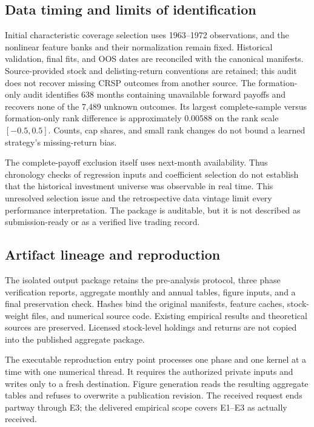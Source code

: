 \subsection{Data timing and limits of identification}
Initial characteristic coverage selection uses 1963--1972 observations, and the nonlinear feature banks and their normalization remain fixed. Historical validation, final fits, and OOS dates are reconciled with the canonical manifests. Source-provided stock and delisting-return conventions are retained; this audit does not recover missing CRSP outcomes from another source. The formation-only audit identifies 638 months containing unavailable forward payoffs and recovers none of the 7,489 unknown outcomes. Its largest complete-sample versus formation-only rank difference is approximately 0.00588 on the rank scale $[-0.5,0.5]$. Counts, cap shares, and small rank changes do not bound a learned strategy's missing-return bias.

The complete-payoff exclusion itself uses next-month availability. Thus chronology checks of regression inputs and coefficient selection do not establish that the historical investment universe was observable in real time. This unresolved selection issue and the retrospective data vintage limit every performance interpretation. The package is auditable, but it is not described as submission-ready or as a verified live trading record.

\subsection{Artifact lineage and reproduction}
The isolated output package retains the pre-analysis protocol, three phase verification reports, aggregate monthly and annual tables, figure inputs, and a final preservation check. Hashes bind the original manifests, feature caches, stock-weight files, and numerical source code. Existing empirical results and theoretical sources are preserved. Licensed stock-level holdings and returns are not copied into the published aggregate package.

The executable reproduction entry point processes one phase and one kernel at a time with one numerical thread. It requires the authorized private inputs and writes only to a fresh destination. Figure generation reads the resulting aggregate tables and refuses to overwrite a publication revision. The received request ends partway through E3; the delivered empirical scope covers E1--E3 as actually received.
